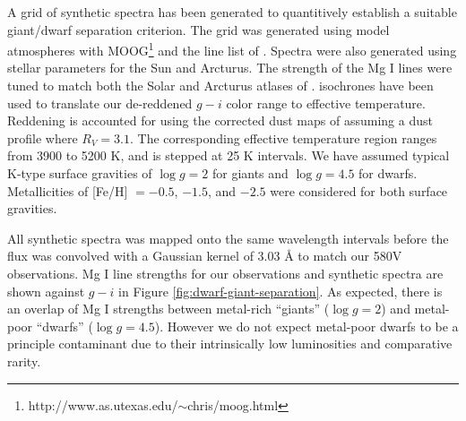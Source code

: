 A grid of synthetic spectra has been generated to quantitively establish a suitable giant/dwarf separation criterion. The grid was generated using \citet{Castelli;Kurucz_2004} model atmospheres with MOOG\footnote{http://www.as.utexas.edu/$\sim$chris/moog.html} and the line list of \citet{Kurucz;Bell_1995}. Spectra were also generated using stellar parameters for the Sun and Arcturus. The strength of the Mg I lines were tuned to match both the Solar and Arcturus atlases of \citet{Hinkle;et-al_2003}. \citet{Girardi;et-al_2004} isochrones have been used to translate our de-reddened $g - i$ color range to effective temperature. Reddening is accounted for using the \citet{Schlafly;Finkbeiner_2011} corrected dust maps of \citet{Schlegel;Finkbeiner;Davis_1998} assuming a \citet{Fitzpatrick_1999} dust profile where $R_V = 3.1$. The corresponding effective temperature region ranges from 3900 to 5200 K, and is stepped at 25 K intervals. We have assumed typical K-type surface gravities of $\log{g} = 2$ for giants and $\log{g} = 4.5$ for dwarfs. Metallicities of [Fe/H] $= -0.5$, $-1.5$, and $-2.5$ were considered for both surface gravities.

All synthetic spectra was mapped onto the same wavelength intervals before the flux was convolved with a Gaussian kernel of 3.03 \AA{} to match our 580V observations. Mg I line strengths for our observations and synthetic spectra are shown against $g - i$ in Figure \ref{fig:dwarf-giant-separation}. As expected, there is an overlap of Mg I strengths between metal-rich ``giants'' ($\log{g} = 2$) and metal-poor ``dwarfs'' ($\log{g} = 4.5$). However we do not expect metal-poor dwarfs to be a principle contaminant due to their intrinsically low luminosities and comparative rarity.

